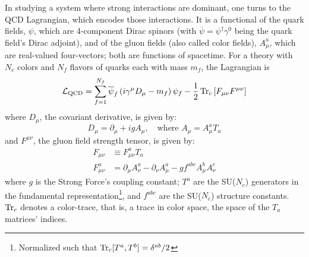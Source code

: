In studying a system where strong interactions are dominant, one turns to the QCD Lagrangian, which encodes those interactions. It is a functional of the quark fields, $\psi$, which are 4-component Dirac spinors (with $\overline{\psi} = \psi^\dagger \gamma^0$ being the quark field's Dirac adjoint), and of the gluon fields (also called color fields), $A^a_\mu$, which are real-valued four-vectors; both are functions of spacetime. For a theory with $N_c$ colors and $N_f$ flavors of quarks each with mass $m_f$,
 the Lagrangian is
\begin{equation}
	\mathcal{L}_\text{QCD} = \sum_{f=1}^{N_f}\overline{\psi}_f \left(i \gamma^\mu D_\mu - m_f \right) \psi_f - \frac{1}{2} \Tr_c \left[ F_{\mu \nu} F^{\mu \nu} \right] %
	\label{eq:QCD_Lagrangian}
\end{equation}
where $D_\mu$, the covariant derivative, is given by:
\begin{equation}
	D_\mu =  \partial_\mu + i g A_\mu, \quad \text{where }  A_\mu = A_\mu^a T_a
\end{equation}
and $F^{\mu \nu}$, the gluon field strength tensor, is given by:
\begin{equation}
\begin{split}
	F_{\mu \nu} &\equiv F_{\mu \nu}^a T_a\\
	F_{\mu \nu}^a & = \partial_\mu A_\nu^a - \partial_\nu A_\mu^a - g f^{a b c} A^b_\mu A^c_\nu
\end{split}
\end{equation}
where $g$ is the Strong Force's coupling constant; $T^a$ are the SU($N_c$) generators in the fundamental representation\footnote{Normalized such that $\operatorname{Tr}_c [T^a, T^b] = \delta^{ab}/2$}, and $f^{abc}$ are the SU($N_c$) structure constants. $\operatorname{Tr}_c$ denotes a color-trace, that is, a trace in color space, the space of the $T_a$ matrices' indices.


